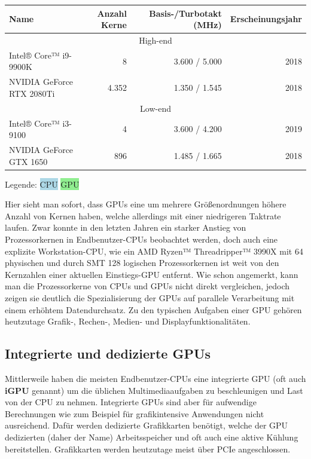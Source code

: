 \documentclass[oneside]{ausarbeitung}
\begin{document}
\begin{minipage}{1.0\textwidth}
\begin{center}
\begin{tabular}{ |l|r|r|r| }
    \hline
    Name & Anzahl Kerne & Basis-/Turbotakt (MHz) & Erscheinungsjahr \\
    \hline
    \multicolumn{4}{|c|}{High-end} \\
    \hline
    \rowcolor{lightblue}
    Intel® Core™ i9-9900K \cite{intel:i9_9900k} & 8 & 3.600 / 5.000 & 2018 \\
    \rowcolor{lightgreen}
    NVIDIA GeForce RTX 2080Ti \cite{nvidia:rtx_2080ti} & 4.352 & 1.350 / 1.545 & 2018 \\
    \hline
    \multicolumn{4}{|c|}{Low-end} \\
    \hline
    \rowcolor{lightblue}
    Intel® Core™ i3-9100 \cite{intel:i3_9100} & 4 & 3.600 / 4.200 & 2019 \\
    \rowcolor{lightgreen}
    NVIDIA GeForce GTX 1650 \cite{nvidia:gtx_1650} & 896 & 1.485 / 1.665 & 2018 \\
    \hline
\end{tabular}
\end{center}
Legende: \colorbox{lightblue}{\ac{CPU}} \colorbox{lightgreen}{\ac{GPU}}
\end{minipage}

Hier sieht man sofort, dass \ac{GPU}s eine um mehrere Größenordnungen höhere Anzahl von Kernen haben, welche allerdings mit einer niedrigeren Taktrate laufen. Zwar konnte in den letzten Jahren ein starker Anstieg von Prozessorkernen in Endbenutzer-\ac{CPU}s beobachtet werden, doch auch eine explizite Workstation-\ac{CPU}, wie ein AMD Ryzen™ Threadripper™ 3990X \cite{amd:threadripper_3990x} mit 64 physischen und durch \ac{SMT} 128 logischen Prozessorkernen ist weit von den Kernzahlen einer aktuellen Einstiegs-\ac{GPU} entfernt. Wie schon angemerkt, kann man die Prozessorkerne von \ac{CPU}s und \ac{GPU}s nicht direkt vergleichen, jedoch zeigen sie deutlich die Spezialisierung der \ac{GPU}s auf parallele Verarbeitung mit einem erhöhtem Datendurchsatz.
Zu den typischen Aufgaben einer \ac{GPU} gehören heutzutage Grafik-, Rechen-, Medien- und Displayfunktionalitäten. 

\subsection{Integrierte und dedizierte GPUs}
\label{sub:GPU_dedicated_integrated}
Mittlerweile haben die meisten Endbenutzer-\ac{CPU}s eine integrierte \ac{GPU} (oft auch \textbf{iGPU} genannt) um die üblichen Multimediaaufgaben zu beschleunigen und Last von der \ac{CPU} zu nehmen. Integrierte \ac{GPU}s sind aber für aufwendige Berechnungen wie zum Beispiel für grafikintensive Anwendungen nicht ausreichend. Dafür werden dedizierte Grafikkarten benötigt, welche der \ac{GPU} dedizierten (daher der Name) Arbeitsspeicher und oft auch eine aktive Kühlung bereitstellen. Grafikkarten werden heutzutage meist über \ac{PCIe} angeschlossen.
\end{document}
